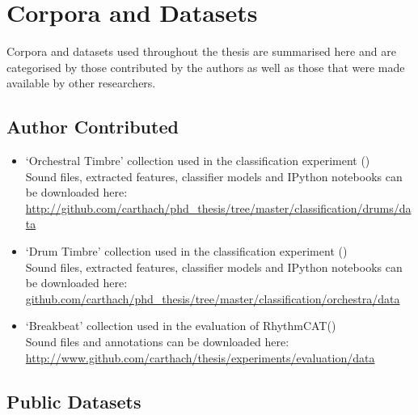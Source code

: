 \section*{Corpora and Datasets}

Corpora and datasets used throughout the thesis are summarised here and are categorised by those contributed by the authors as well as those that were made available by other researchers.

\subsection*{Author Contributed}

\begin{itemize}
	\item `Orchestral Timbre' collection used in the classification experiment () \\ 
	Sound files, extracted features, classifier models and IPython notebooks can be downloaded here:\\
	\url{http://github.com/carthach/phd_thesis/tree/master/classification/drums/data}
	\item `Drum Timbre' collection used in the classification experiment () \\ 
	Sound files, extracted features, classifier models and IPython notebooks can be downloaded here:\\
	\url{github.com/carthach/phd_thesis/tree/master/classification/orchestra/data}	
	\item `Breakbeat' collection used in the evaluation of RhythmCAT() \\ 
	Sound files and annotations can be downloaded here:\\
	\url{http://www.github.com/carthach/thesis/experiments/evaluation/data}	
\end{itemize}

\subsection*{Public Datasets}

